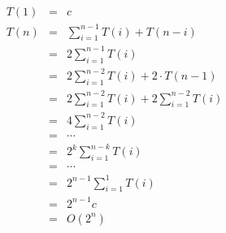 \begin{eqnarray}
T(1) &=& c\\
T(n) &=& \sum_{i=1}^{n-1} T(i) + T(n-i) \\
     &=& 2 \sum_{i=1}^{n-1} T(i) \\
     &=& 2 \sum_{i=1}^{n-2} T(i) + 2 \cdot T(n-1) \\
     &=& 2 \sum_{i=1}^{n-2} T(i) + 2 \sum_{i=1}^{n-2} T(i) \\
     &=& 4 \sum_{i=1}^{n-2} T(i) \\
     &=& \cdots \\
     &=& 2^k \sum_{i=1}^{n-k} T(i) \\ 
     &=& \cdots \\
     &=& 2^{n-1} \sum_{i=1}^{1} T(i) \\ 
     &=& 2^{n-1} c \\
     &=& O(2^n)
\end{eqnarray}


